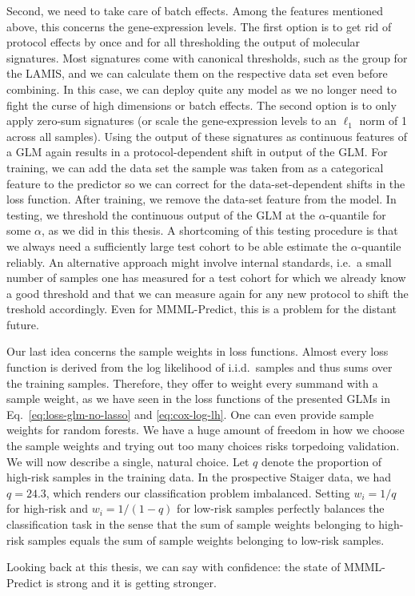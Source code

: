 Second, we need to take care of batch effects. Among the features mentioned above, this concerns 
the gene-expression levels. The first option is to get rid of protocol effects by once and for all
thresholding the output of molecular signatures. Most signatures come with canonical thresholds, 
such as the group for the LAMIS, and we can calculate them on the respective data set even before 
combining. In this case, we can deploy quite any model as we no longer need to fight the curse 
of high dimensions or batch effects. The second option is to only apply zero-sum signatures (or 
scale the gene-expression levels to an $\ell_1$ norm of \num{1} across all samples). Using the 
output of these signatures as continuous features of a GLM again results in a protocol-dependent 
shift in output of the GLM. For training, we can add the data set the sample was taken from as a 
categorical 
feature to the predictor so we can correct for the data-set-dependent shifts in the loss function. 
After training, we remove the data-set feature from the model. In testing, 
we threshold the continuous output of the GLM at the $\alpha$-quantile for some $\alpha$, as we did 
in this thesis. A shortcoming of this testing procedure is that we always need a sufficiently large 
test cohort to be able estimate the $\alpha$-quantile reliably. An alternative approach might 
involve internal standards, i.e.\ a small number of samples one has measured for a test cohort for 
which we already know a good threshold and that we can measure again for any new protocol to shift 
the treshold accordingly. Even for MMML-Predict, this is a problem for the distant future.

Our last idea concerns the sample weights in loss functions. Almost every loss function is derived 
from the log likelihood of i.i.d.\ samples and thus sums over the training samples. Therefore, they 
offer to weight every summand with a sample weight, as we have seen in the loss functions of the 
presented GLMs in Eq.\ \eqref{eq:loss-glm-no-lasso} and \eqref{eq:cox-log-lh}. One can even provide 
sample weights for random forests. We have a huge amount of 
freedom in how we choose the sample weights and trying out too many choices risks torpedoing 
validation. We will now describe a single, natural choice. Let $q$ denote the 
proportion of high-risk samples in the training data. In the prospective Staiger data, we had 
$q = \num{24.3}$, which renders our classification problem imbalanced. Setting $w_i = 1/q$ for 
high-risk and $w_i = 1/(1-q)$ for low-risk samples perfectly balances the classification task in 
the sense that the sum of sample weights belonging to high-risk samples equals the sum of sample 
weights belonging to low-risk samples.

Looking back at this thesis, we can say with confidence: the state of MMML-Predict is strong and 
it is getting stronger.